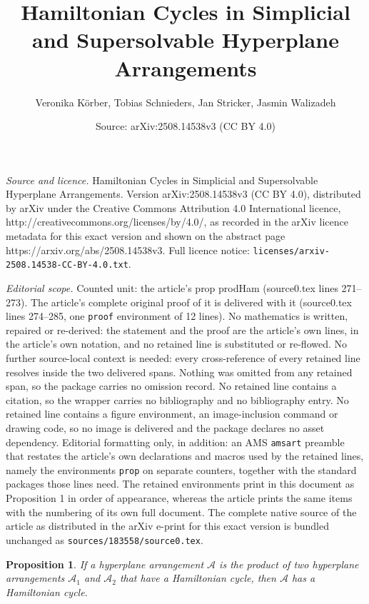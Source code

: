 \documentclass[10pt,a4paper]{amsart}
\title{Hamiltonian Cycles in Simplicial and Supersolvable Hyperplane Arrangements}
\author{Veronika K\"orber, Tobias Schnieders, Jan Stricker, Jasmin Walizadeh}
\date{Source: arXiv:2508.14538v3 (CC BY 4.0)}
\newtheorem{prop}{Proposition}
\newcommand{\A}{\mathcal{A}}
\newcommand{\mA}{{\mathcal A}}
\begin{document}
\maketitle

\noindent\emph{Source and licence.} Hamiltonian Cycles in Simplicial and Supersolvable Hyperplane Arrangements. Version arXiv:2508.14538v3 (CC BY 4.0), distributed by arXiv under the Creative Commons Attribution 4.0 International licence, http://creativecommons.org/licenses/by/4.0/, as recorded in the arXiv licence metadata for this exact version and shown on the abstract page https://arxiv.org/abs/2508.14538v3. Full licence notice: \texttt{licenses/arxiv-2508.14538-CC-BY-4.0.txt}.\par\smallskip

\noindent\textit{Editorial scope.} Counted unit: the article's prop prodHam (source0.tex lines 271--273). The article's complete original proof of it is delivered with it (source0.tex lines 274--285, one \texttt{proof} environment of 12 lines). No mathematics is written, repaired or re-derived: the statement and the proof are the article's own lines, in the article's own notation, and no retained line is substituted or re-flowed.  No further source-local context is needed: every cross-reference of every retained line resolves inside the two delivered spans.  Nothing was omitted from any retained span, so the package carries no omission record.  No retained line contains a citation, so the wrapper carries no bibliography and no bibliography entry.  No retained line contains a figure environment, an image-inclusion command or drawing code, so no image is delivered and the package declares no asset dependency.  Editorial formatting only, in addition: an AMS \texttt{amsart} preamble that restates the article's own declarations and macros used by the retained lines, namely the environments \texttt{prop} on separate counters, together with the standard packages those lines need.  The retained environments print in this document as Proposition 1 in order of appearance, whereas the article prints the same items with the numbering of its own full document.  The complete native source of the article as distributed in the arXiv e-print for this exact version is bundled unchanged as \texttt{sources/183558/source0.tex}.
	\begin{prop}\label{prodHam}
		If a hyperplane arrangement $\mA$ is the product of two hyperplane arrangements $\A_1$ and $\A_2$ that have a Hamiltonian cycle, then $\mA$ has a Hamiltonian cycle.
	\end{prop}
\end{document}

